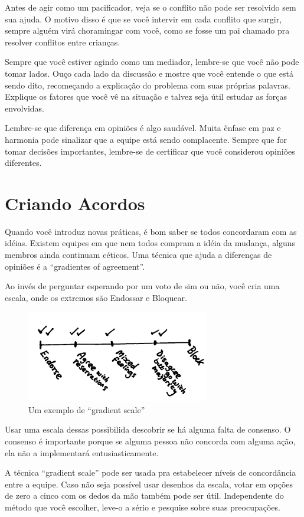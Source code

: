 \documentclass[a4paper, 10pt, font=plain]{abnt}
\begin{document}
Antes de agir como um pacificador, veja se o conflito não pode ser resolvido sem sua ajuda. O motivo disso é que se você intervir em cada conflito que surgir, sempre alguém virá choramingar com você, como se fosse um pai chamado pra resolver conflitos entre crianças.

Sempre que você estiver agindo como um mediador, lembre-se que você não pode tomar lados. Ouço cada lado da discussão e mostre que você entende o que está sendo dito, recomeçando a explicação do problema com suas próprias palavras. Explique os fatores que você vê na situação e talvez seja útil estudar as forças envolvidas.

Lembre-se que diferença em opiniões é algo saudável. Muita ênfase em paz e harmonia pode sinalizar que a equipe está sendo complacente. Sempre que for tomar decisões importantes, lembre-se de certificar que você considerou opiniões diferentes.



\section{Criando Acordos}
Quando você introduz novas práticas, é bom saber se todos concordaram com as idéias. Existem equipes em que nem todos compram a idéia da mudança, alguns membros ainda continuam céticos. Uma técnica que ajuda a diferenças de opiniões é a ``gradientes of agreement''.

Ao invés de perguntar esperando por um voto de sim ou não, você cria uma escala, onde os extremos são Endossar e Bloquear.

\begin{figure}[h]
    \centering
    \includegraphics[width=8cm]{gradient_scale}
    \caption{Um exemplo de ``gradient scale''}
\end{figure}

Usar uma escala dessas possibilida descobrir se há alguma falta de consenso. O consenso é importante porque se alguma pessoa não concorda com alguma ação, ela não a implementará entusiasticamente.

A técnica ``gradient scale'' pode ser usada pra estabelecer níveis de concordância entre a equipe. Caso não seja possível usar desenhos da escala, votar em opções de zero a cinco com os dedos da mão também pode ser útil. Independente do método que você escolher, leve-o a sério e pesquise sobre suas preocupações.
\end{document}
